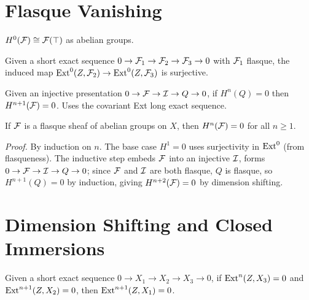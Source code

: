 \chapter{Flasque Vanishing}\label{ch:flasque}

\begin{lemma}[Sections at $H^0$]\label{lem:sheafH0EquivSections}
  \leanok
  $H^0(\mathcal{F}) \cong \mathcal{F}(\top)$ as abelian groups.
\end{lemma}

\begin{lemma}\label{lem:ext_zero_map_surjective}
  \leanok
  Given a short exact sequence $0 \to \mathcal{F}_1 \to \mathcal{F}_2 \to \mathcal{F}_3 \to 0$
  with $\mathcal{F}_1$ flasque, the induced map
  $\operatorname{Ext}^0(Z, \mathcal{F}_2) \to \operatorname{Ext}^0(Z, \mathcal{F}_3)$ is surjective.
\end{lemma}

\begin{lemma}\label{lem:sheafH_dimension_shift}
  \leanok
  Given an injective presentation $0 \to \mathcal{F} \to \mathcal{I} \to Q \to 0$,
  if $H^n(Q) = 0$ then $H^{n+1}(\mathcal{F}) = 0$.
  Uses the covariant Ext long exact sequence.
\end{lemma}

\begin{theorem}\label{thm:FlasqueVanishing}
  \leanok
  If $\mathcal{F}$ is a flasque sheaf of abelian groups on $X$, then $H^n(\mathcal{F}) = 0$
  for all $n \ge 1$.

  \emph{Proof.} By induction on $n$. The base case $H^1 = 0$ uses surjectivity
  in $\operatorname{Ext}^0$ (from flasqueness). The inductive step embeds $\mathcal{F}$ into an
  injective $\mathcal{I}$, forms $0 \to \mathcal{F} \to \mathcal{I} \to Q \to 0$; since $\mathcal{F}$ and $\mathcal{I}$
  are both flasque, $Q$ is flasque, so $H^{n+1}(Q) = 0$ by induction,
  giving $H^{n+2}(\mathcal{F}) = 0$ by dimension shifting.
\end{theorem}


\chapter{Dimension Shifting and Closed Immersions}\label{ch:dimshift}

\begin{lemma}\label{lem:ext_dimension_shift}
  \leanok
  Given a short exact sequence $0 \to X_1 \to X_2 \to X_3 \to 0$,
  if $\operatorname{Ext}^n(Z, X_3) = 0$ and $\operatorname{Ext}^{n+1}(Z, X_2) = 0$,
  then $\operatorname{Ext}^{n+1}(Z, X_1) = 0$.
\end{lemma}

